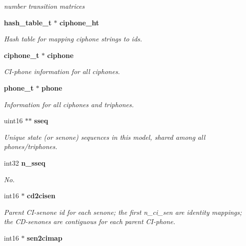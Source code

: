 \begin{DoxyCompactItemize}
\begin{DoxyCompactList}\small\item\em number transition matrices \end{DoxyCompactList}\item 
{\bf hash\-\_\-table\-\_\-t} $\ast$ {\bf ciphone\-\_\-ht}\label{structmdef__t_a1091b9f34193255ccf6038d75523187b}

\begin{DoxyCompactList}\small\item\em Hash table for mapping ciphone strings to ids. \end{DoxyCompactList}\item 
{\bf ciphone\-\_\-t} $\ast$ {\bf ciphone}\label{structmdef__t_aae4a51202b87f71394b6c5b3138b77c7}

\begin{DoxyCompactList}\small\item\em C\-I-\/phone information for all ciphones. \end{DoxyCompactList}\item 
{\bf phone\-\_\-t} $\ast$ {\bf phone}\label{structmdef__t_a2b9aaf78e5648fe14655d1fe8da5f164}

\begin{DoxyCompactList}\small\item\em Information for all ciphones and triphones. \end{DoxyCompactList}\item 
uint16 $\ast$$\ast$ {\bf sseq}\label{structmdef__t_a2472170a66d451d2d4873a9a6e64adc7}

\begin{DoxyCompactList}\small\item\em Unique state (or senone) sequences in this model, shared among all phones/triphones. \end{DoxyCompactList}\item 
int32 {\bf n\-\_\-sseq}
\begin{DoxyCompactList}\small\item\em No. \end{DoxyCompactList}\item 
int16 $\ast$ {\bf cd2cisen}\label{structmdef__t_ae2ba90b39a79603022daae3c9270a0b7}

\begin{DoxyCompactList}\small\item\em Parent C\-I-\/senone id for each senone; the first n\-\_\-ci\-\_\-sen are identity mappings; the C\-D-\/senones are contiguous for each parent C\-I-\/phone. \end{DoxyCompactList}\item 
int16 $\ast$ {\bf sen2cimap}\label{structmdef__t_a4aafd791a1e1adaa9b5b28bf0cfbd624}


\end{DoxyCompactItemize}
